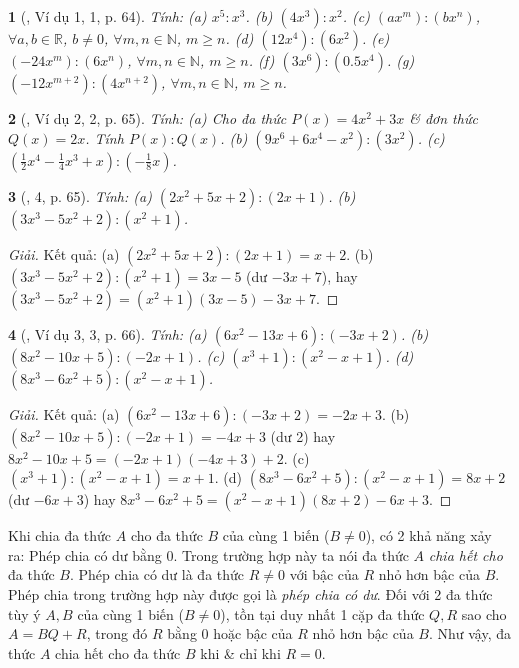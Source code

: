 \documentclass{article}
\newtheorem{baitoan}{}
\begin{document}
\begin{baitoan}[\cite{SGK_Toan_7_Canh_Dieu_tap_2}, Ví dụ 1, 1, p. 64]
	Tính: (a) $x^5:x^3$. (b) $(4x^3):x^2$. (c) $(ax^m):(bx^n)$, $\forall a,b\in\mathbb{R}$, $b\ne0$, $\forall m,n\in\mathbb{N}$, $m\ge n$. (d) $(12x^4):(6x^2)$. (e) $(-24x^m):(6x^n)$, $\forall m,n\in\mathbb{N}$, $m\ge n$. (f) $(3x^6):(0.5x^4)$. (g) $(-12x^{m+2}):(4x^{n+2})$, $\forall m,n\in\mathbb{N}$, $m\ge n$.
\end{baitoan}

\begin{baitoan}[\cite{SGK_Toan_7_Canh_Dieu_tap_2}, Ví dụ 2, 2, p. 65]
	Tính: (a) Cho đa thức $P(x) = 4x^2 + 3x$ \& đơn thức $Q(x) = 2x$. Tính $P(x):Q(x)$. (b) $(9x^6 + 6x^4 - x^2):(3x^2)$. (c) $\left(\frac{1}{2}x^4 - \frac{1}{4}x^3 + x\right):\left(-\frac{1}{8}x\right)$.
\end{baitoan}

\begin{baitoan}[\cite{SGK_Toan_7_Canh_Dieu_tap_2}, 4, p. 65]
	Tính: (a) $(2x^2 + 5x + 2):(2x + 1)$. (b) $(3x^3 - 5x^2 + 2):(x^2 + 1)$.
\end{baitoan}

\begin{proof}[Giải]
	Kết quả: (a) $(2x^2 + 5x + 2):(2x + 1) = x + 2$. (b) $(3x^3 - 5x^2 + 2):(x^2 + 1) = 3x - 5$ (dư $-3x + 7$), hay $(3x^3 - 5x^2 + 2) = (x^2 + 1)(3x - 5) - 3x + 7$.
\end{proof}

\begin{baitoan}[\cite{SGK_Toan_7_Canh_Dieu_tap_2}, Ví dụ 3, 3, p. 66]
	Tính: (a) $(6x^2 - 13x + 6):(-3x + 2)$. (b) $(8x^2 - 10x + 5):(-2x + 1)$. (c) $(x^3 + 1):(x^2 - x + 1)$. (d) $(8x^3 - 6x^2 + 5):(x^2 - x + 1)$.
\end{baitoan}

\begin{proof}[Giải]
	Kết quả: (a) $(6x^2 - 13x + 6):(-3x + 2) = -2x + 3$. (b) $(8x^2 - 10x + 5):(-2x + 1) = -4x + 3$ (dư 2) hay $8x^2 - 10x + 5 = (-2x + 1)(-4x + 3) + 2$. (c) $(x^3 + 1):(x^2 - x + 1) = x + 1$. (d) $(8x^3 - 6x^2 + 5):(x^2 - x + 1) = 8x + 2$ (dư $-6x + 3$) hay $8x^3 - 6x^2 + 5 = (x^2 - x + 1)(8x + 2) - 6x + 3$.
\end{proof}
Khi chia đa thức $A$ cho đa thức $B$ của cùng 1 biến ($B\ne0$), có 2 khả năng xảy ra: Phép chia có dư bằng $0$. Trong trường hợp này ta nói đa thức $A$ \textit{chia hết cho} đa thức $B$. Phép chia có dư là đa thức $R\ne0$ với bậc của $R$ nhỏ hơn bậc của $B$. Phép chia trong trường hợp này được gọi là \textit{phép chia có dư}. Đối với 2 đa thức tùy ý $A,B$ của cùng 1 biến ($B\ne0$), tồn tại duy nhất 1 cặp đa thức $Q,R$ sao cho $A = BQ + R$, trong đó $R$ bằng $0$ hoặc bậc của $R$ nhỏ hơn bậc của $B$. Như vậy, đa thức $A$ chia hết cho đa thức $B$ khi \& chỉ khi $R = 0$.
\end{document}
